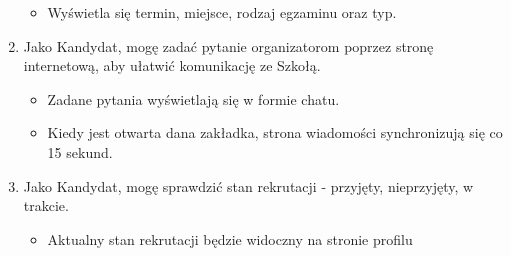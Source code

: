 \documentclass{article}
\begin{document}
\begin{enumerate}
        \begin{itemize}
            \item Wyświetla się termin, miejsce, rodzaj egzaminu oraz typ.
        \end{itemize}
    \item Jako Kandydat, mogę zadać pytanie organizatorom poprzez stronę internetową, aby ułatwić komunikację ze Szkołą.
        \begin{itemize}
            \item Zadane pytania wyświetlają się w formie chatu.
            \item Kiedy jest otwarta dana zakładka, strona wiadomości synchronizują się co 15 sekund.
        \end{itemize}
    \item Jako Kandydat, mogę sprawdzić stan rekrutacji - przyjęty, nieprzyjęty, w trakcie.
        \begin{itemize}
            \item Aktualny stan rekrutacji będzie widoczny na stronie profilu
        \end{itemize}
\end{enumerate}
\end{document}
